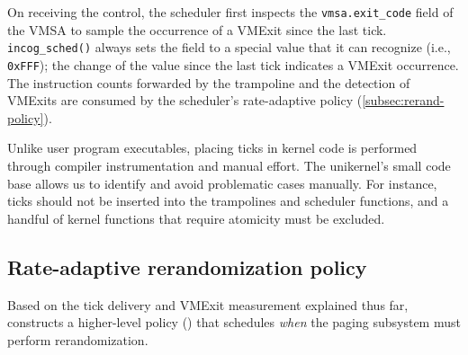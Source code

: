 \label{subsubsec:sched-func}
On receiving the control, the scheduler first inspects the \texttt{vmsa.exit\_code} field of the VMSA to sample the occurrence of a VMExit since the last tick.
\texttt{incog\_sched()} always sets the field to a special value that it can recognize (i.e., \texttt{0xFFF}); the change of the value since the last tick indicates a VMExit occurrence.
The instruction counts forwarded by the trampoline and the detection of VMExits are consumed by the scheduler's rate-adaptive policy (\cref{subsec:rerand-policy}).


Unlike user program executables, placing ticks in kernel code is performed through compiler instrumentation and manual effort.
The unikernel's small code base allows us to identify and avoid problematic cases manually.
For instance, ticks should not be inserted into the trampolines and scheduler functions, and a handful of kernel functions that require atomicity must be excluded.




\subsection{Rate-adaptive rerandomization policy}
\label{sec:scheduling:services}
\label{sec:scheduling:policies}
\label{subsec:rerand-policy}

Based on the tick delivery and VMExit measurement explained thus far, \thename constructs a higher-level policy (\reqrobustpolicy) that schedules \emph{when} the paging subsystem must perform rerandomization.


